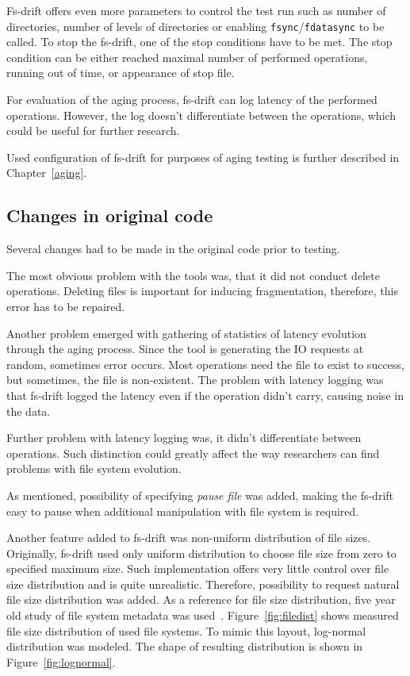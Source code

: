 \documentclass[
  color, %
  table, %
  lof,   %
  lot,   %
]{fithesis3}
\begin{document}
Fs-drift offers even more parameters to control the test run such as number of directories, number of levels of directories or enabling \texttt{fsync}/\texttt{fdatasync} to be called. To stop the fs-drift, one of the stop conditions have to be met. The stop condition can be either reached maximal number of performed operations, running out of time, or appearance of stop file.

For evaluation of the aging process, fs-drift can log latency of the performed operations. However, the log doesn't differentiate between the operations, which could be useful for further research.

Used configuration of fs-drift for purposes of aging testing is further described in Chapter~\ref{aging}.

\subsection{Changes in original code}
\label{text:fsdrift_changes}
Several changes had to be made in the original code prior to testing.

The most obvious problem with the tools was, that it did not conduct delete operations. Deleting files is important for inducing fragmentation, therefore, this error has to be repaired.

Another problem emerged with gathering  of statistics of latency evolution through the aging process. Since the tool is generating the IO requests at random, sometimes error occurs. Most operations need the file to exist to success, but sometimes, the file is non-existent. The problem with latency logging was that fs-drift logged the latency even if the operation didn't carry, causing noise in the data.

Further problem with latency logging was, it didn't differentiate between operations. Such distinction could greatly affect the way researchers can find problems with file system evolution.

As mentioned, possibility of specifying \emph{pause file} was added, making the fs-drift easy to pause when additional manipulation with file system is required.

Another feature added to fs-drift was non-uniform distribution of file sizes. Originally, fs-drift used only uniform distribution to choose file size from zero to specified maximum size. Such implementation offers very little control over file size distribution and is quite unrealistic. Therefore, possibility to request natural file size distribution was added. As a reference for file size distribution, five year old study of file system metadata was used~\cite{agrawal2007five}. Figure~\ref{fig:filedist} shows measured file size distribution of used file systems. To mimic this layout, log-normal distribution was modeled. The shape of resulting distribution is shown in Figure~\ref{fig:lognormal}.
\end{document}

